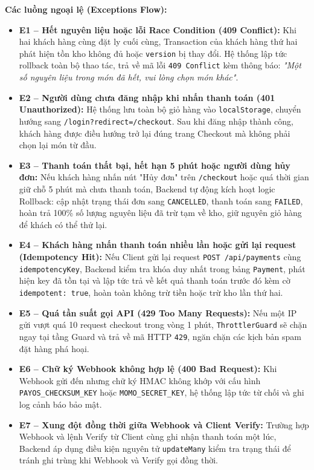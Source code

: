 \documentclass[11pt,a4paper]{article}
\begin{document}
\textbf{Các luồng ngoại lệ (Exceptions Flow):}
\begin{itemize}[leftmargin=*]
    \item \textbf{E1 -- Hết nguyên liệu hoặc lỗi Race Condition (409 Conflict):} Khi hai khách hàng cùng đặt ly cuối cùng, Transaction của khách hàng thứ hai phát hiện tồn kho không đủ hoặc \texttt{version} bị thay đổi. Hệ thống lập tức rollback toàn bộ thao tác, trả về mã lỗi \texttt{409 Conflict} kèm thông báo: \textit{"Một số nguyên liệu trong món đã hết, vui lòng chọn món khác"}.
    \item \textbf{E2 -- Người dùng chưa đăng nhập khi nhấn thanh toán (401 Unauthorized):} Hệ thống lưu toàn bộ giỏ hàng vào \texttt{localStorage}, chuyển hướng sang \texttt{/login?redirect=/checkout}. Sau khi đăng nhập thành công, khách hàng được điều hướng trở lại đúng trang Checkout mà không phải chọn lại món từ đầu.
    \item \textbf{E3 -- Thanh toán thất bại, hết hạn 5 phút hoặc người dùng hủy đơn:} Nếu khách hàng nhấn nút "Hủy đơn" trên \texttt{/checkout} hoặc quá thời gian giữ chỗ 5 phút mà chưa thanh toán, Backend tự động kích hoạt logic Rollback: cập nhật trạng thái đơn sang \texttt{CANCELLED}, thanh toán sang \texttt{FAILED}, hoàn trả 100\% số lượng nguyên liệu đã trừ tạm về kho, giữ nguyên giỏ hàng để khách có thể thử lại.
    \item \textbf{E4 -- Khách hàng nhấn thanh toán nhiều lần hoặc gửi lại request (Idempotency Hit):} Nếu Client gửi lại request \texttt{POST /api/payments} cùng \texttt{idempotencyKey}, Backend kiểm tra khóa duy nhất trong bảng \texttt{Payment}, phát hiện key đã tồn tại và lập tức trả về kết quả thanh toán trước đó kèm cờ \texttt{idempotent: true}, hoàn toàn không trừ tiền hoặc trừ kho lần thứ hai.
    \item \textbf{E5 -- Quá tần suất gọi API (429 Too Many Requests):} Nếu một IP gửi vượt quá 10 request checkout trong vòng 1 phút, \texttt{ThrottlerGuard} sẽ chặn ngay tại tầng Guard và trả về mã HTTP \texttt{429}, ngăn chặn các kịch bản spam đặt hàng phá hoại.
    \item \textbf{E6 -- Chữ ký Webhook không hợp lệ (400 Bad Request):} Khi Webhook gửi đến nhưng chữ ký HMAC không khớp với cấu hình \texttt{PAYOS\_CHECKSUM\_KEY} hoặc \texttt{MOMO\_SECRET\_KEY}, hệ thống lập tức từ chối và ghi log cảnh báo bảo mật.
    \item \textbf{E7 -- Xung đột đồng thời giữa Webhook và Client Verify:} Trường hợp Webhook và lệnh Verify từ Client cùng ghi nhận thanh toán một lúc, Backend áp dụng điều kiện nguyên tử \texttt{updateMany} kiểm tra trạng thái để tránh ghi trùng khi Webhook và Verify gọi đồng thời.
\end{itemize}
\clearpage
\end{document}
